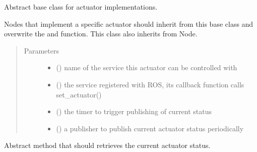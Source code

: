 \documentclass[a4paper,12pt,twoside]{article}
\begin{document}
\begin{fulllineitems}
\label{\detokenize{osbk_devices:osbk_devices.actuator_base.ActuatorBase}}
Abstract base class for actuator implementations.

Nodes that implement a specific actuator should inherit from this base class and overwrite the
 and  function. This class also inherits from Node.
\begin{quote}\begin{description}
\item[{Parameters}] \leavevmode\begin{itemize}
\item {} 
 () \textendash{} name of the service this actuator can be
controlled with

\item {} 
 () \textendash{} the service registered with ROS, its callback function calls
set\_actuator()

\item {} 
 () \textendash{} the timer to trigger publishing of current status

\item {} 
 () \textendash{} a publisher to publish current actuator status periodically

\end{itemize}

\end{description}\end{quote}

\begin{fulllineitems}
\label{\detokenize{osbk_devices:osbk_devices.actuator_base.ActuatorBase.poll_status}}
Abstract method that should retrieves the current actuator status.


\end{fulllineitems}
\end{fulllineitems}
\end{document}
